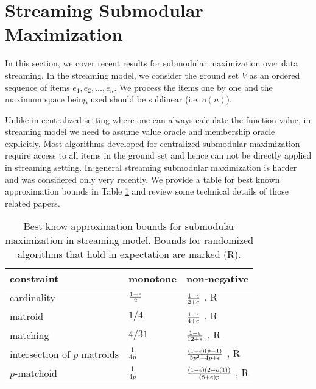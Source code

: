 \section{Streaming Submodular Maximization}
In this section, we cover recent results for submodular maximization over data streaming. In the streaming model, we consider the ground set $V$ as an ordered sequence of items $e_1, e_2, \ldots, e_n$. We process the items one by one and the maximum space being used should be sublinear (i.e. $o(n)$).


Unlike in centralized setting where one can always calculate the function value, in streaming model we need to assume value oracle and membership oracle explicitly.  Most algorithms developed for centralized submodular maximization require access to all items in the ground set and hence can not be directly applied in streaming setting. In general streaming submodular maximization is harder and was considered only very recently. We provide a table for best known approximation bounds in Table \ref{table:streaming} and review some technical details of those related papers.

\begin{table}[t]
\centering
\begin{tabular}{|l|l|l|}
\hline
constraint & monotone  &  non-negative \\
\hline
cardinality & $\frac{1-\epsilon}{2}$ \cite{BMK+14} & $\frac{1 - \epsilon}{2 + e}$ \cite{CGQ15}, R\\
\hline
matroid & $1/4$ \cite{CK14} & $\frac{1 - \epsilon}{4 + e}$ \cite{CGQ15},  R \\
\hline
matching & $4/31$ \cite{CK14} & $\frac{1 - \epsilon}{12 + \epsilon}$ \cite{CGQ15}, R \\
\hline
intersection of $p$ matroids & $\frac{1}{4p}$ \cite{CK14} & $\frac{(1 - \epsilon)(p - 1)}{5p^2 -4p + \epsilon}$ \cite{CGQ15}, R\\
\hline
$p$-matchoid & $\frac{1}{4p}$ \cite{CGQ15} & $\frac{(1-\epsilon)(2-o(1))}{(8+e)p}$ \cite{CGQ15}, R\\
\hline
\end{tabular}
\caption{Best know approximation bounds for submodular maximization in streaming model. Bounds for randomized algorithms that hold in expectation are marked (R).}
\label{table:streaming}
\end{table}






